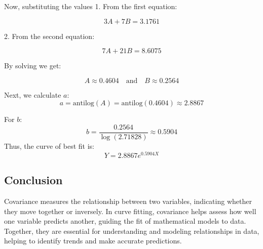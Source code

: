 \documentclass[12pt]{article}
\begin{document}
Now, substituting the values
1. From the first equation:

\[
3A + 7B = 3.1761 \tag{1}
\]

2. From the second equation:

\[
7A + 21B = 8.6075 \tag{2}
\]

By solving we get:

\[
A \approx 0.4604 \quad \text{and} \quad B \approx 0.2564
\]

Next, we calculate \( a \):
\[
a = \text{antilog}(A) = \text{antilog}(0.4604) \approx 2.8867
\]

For \( b \):
\[
b = \frac{0.2564}{\log(2.71828)} \approx 0.5904
\]
Thus, the curve of best fit is:
\[
Y = 2.8867 e^{0.5904X}
\]
\subsection*{Conclusion}
Covariance measures the relationship between two variables, indicating whether they move together or inversely. In curve fitting, covariance helps assess how well one variable predicts another, guiding the fit of mathematical models to data. Together, they are essential for understanding and modeling relationships in data, helping to identify trends and make accurate predictions.

\cite{veerarajan2008probability,grewal2003higher,9647}


\end{document}
